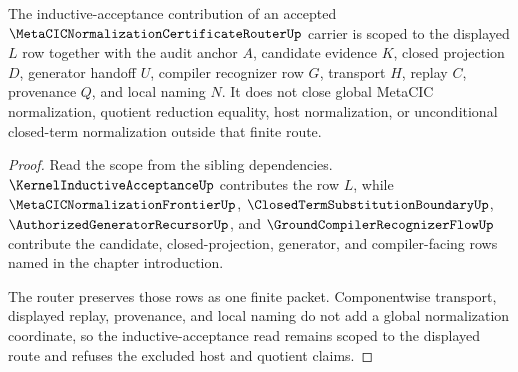 \begin{theorem}
\label{thm:metacic-normalization-certificate-router-inductive-acceptance-scope}
The inductive-acceptance contribution of an accepted $\MetaCICNormalizationCertificateRouterUp$ carrier is scoped to the displayed $L$ row together with the audit anchor $A$, candidate evidence $K$, closed projection $D$, generator handoff $U$, compiler recognizer row $G$, transport $H$, replay $C$, provenance $Q$, and local naming $N$. It does not close global MetaCIC normalization, quotient reduction equality, host normalization, or unconditional closed-term normalization outside that finite route.
\end{theorem}
\begin{proof}
Read the scope from the sibling dependencies. $\KernelInductiveAcceptanceUp$ contributes the row $L$, while $\MetaCICNormalizationFrontierUp$, $\ClosedTermSubstitutionBoundaryUp$, $\AuthorizedGeneratorRecursorUp$, and $\GroundCompilerRecognizerFlowUp$ contribute the candidate, closed-projection, generator, and compiler-facing rows named in the chapter introduction.

The router preserves those rows as one finite packet. Componentwise transport, displayed replay, provenance, and local naming do not add a global normalization coordinate, so the inductive-acceptance read remains scoped to the displayed route and refuses the excluded host and quotient claims.
\end{proof}

